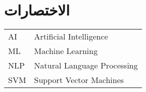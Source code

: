 

\chapter*{الاختصارات}

\begin{doublespacing}
	\begin{center}
		\begin{english}
			\begin{tabular}{l l}
				
				\indent
				AI		&		Artificial Intelligence \\
				
				\indent
				ML		&		Machine Learning \\
				
				\indent
				NLP		&		Natural Language Processing \\
				
				\indent
				SVM		&		Support Vector Machines \\
				
			\end{tabular}
		\end{english}
	\end{center}
\end{doublespacing}

